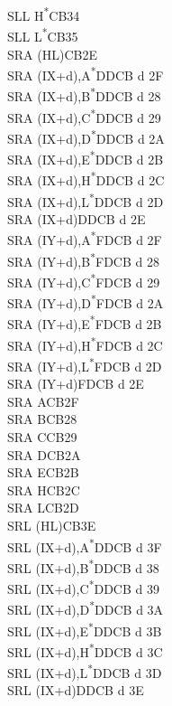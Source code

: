 \documentclass[oneside,a4paper]{book}
\begin{document}
\begin{multicols}{3}
{\begin{tabbing}
SLL H\textsuperscript{*}\>CB34\\
SLL L\textsuperscript{*}\>CB35\\
SRA (HL)\>CB2E\\
SRA (IX+d),A\textsuperscript{*}\>DDCB d 2F\\
SRA (IX+d),B\textsuperscript{*}\>DDCB d 28\\
SRA (IX+d),C\textsuperscript{*}\>DDCB d 29\\
SRA (IX+d),D\textsuperscript{*}\>DDCB d 2A\\
SRA (IX+d),E\textsuperscript{*}\>DDCB d 2B\\
SRA (IX+d),H\textsuperscript{*}\>DDCB d 2C\\
SRA (IX+d),L\textsuperscript{*}\>DDCB d 2D\\
SRA (IX+d)\>DDCB d 2E\\
SRA (IY+d),A\textsuperscript{*}\>FDCB d 2F\\
SRA (IY+d),B\textsuperscript{*}\>FDCB d 28\\
SRA (IY+d),C\textsuperscript{*}\>FDCB d 29\\
SRA (IY+d),D\textsuperscript{*}\>FDCB d 2A\\
SRA (IY+d),E\textsuperscript{*}\>FDCB d 2B\\
SRA (IY+d),H\textsuperscript{*}\>FDCB d 2C\\
SRA (IY+d),L\textsuperscript{*}\>FDCB d 2D\\
SRA (IY+d)\>FDCB d 2E\\
SRA A\>CB2F\\
SRA B\>CB28\\
SRA C\>CB29\\
SRA D\>CB2A\\
SRA E\>CB2B\\
SRA H\>CB2C\\
SRA L\>CB2D\\
SRL (HL)\>CB3E\\
SRL (IX+d),A\textsuperscript{*}\>DDCB d 3F\\
SRL (IX+d),B\textsuperscript{*}\>DDCB d 38\\
SRL (IX+d),C\textsuperscript{*}\>DDCB d 39\\
SRL (IX+d),D\textsuperscript{*}\>DDCB d 3A\\
SRL (IX+d),E\textsuperscript{*}\>DDCB d 3B\\
SRL (IX+d),H\textsuperscript{*}\>DDCB d 3C\\
SRL (IX+d),L\textsuperscript{*}\>DDCB d 3D\\
SRL (IX+d)\>DDCB d 3E\\

\end{tabbing}}
\end{multicols}
\end{document}
